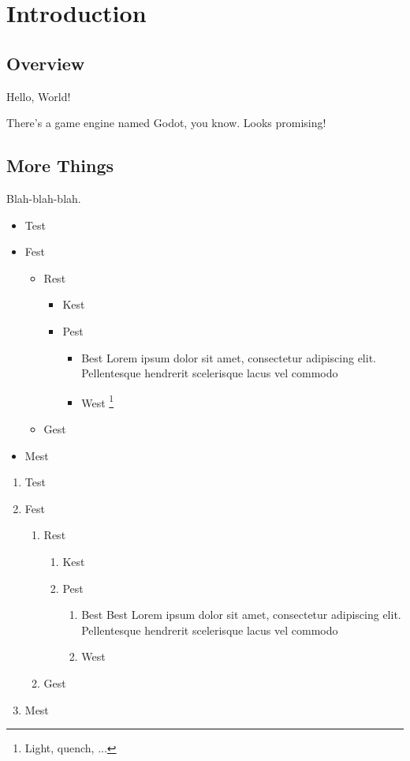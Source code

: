 \chapter{Introduction}
\section{Overview}

Hello, World!

There's a game engine named Godot\cite{godot}, you know. Looks promising!

\section{More Things}

Blah-blah-blah.

\begin{itemize}
    \item Test
    \item Fest
    \begin{itemize}
        \item Rest
        \begin{itemize}
            \item Kest
            \item Pest
            \begin{itemize}
                \item Best Lorem ipsum dolor sit amet, consectetur adipiscing elit. Pellentesque hendrerit scelerisque lacus vel commodo
                \item West \footnote{Light, quench, ...}
            \end{itemize}
        \end{itemize}
        \item Gest
    \end{itemize}
    \item Mest
\end{itemize}

\begin{enumerate}
    \item Test
    \item Fest
    \begin{enumerate}
        \item Rest
        \begin{enumerate}
            \item Kest
            \item Pest
            \begin{enumerate}
                \item Best Best Lorem ipsum dolor sit amet, consectetur adipiscing elit. Pellentesque hendrerit scelerisque lacus vel commodo
                \item West
            \end{enumerate}
        \end{enumerate}
        \item Gest
    \end{enumerate}
    \item Mest
\end{enumerate}
